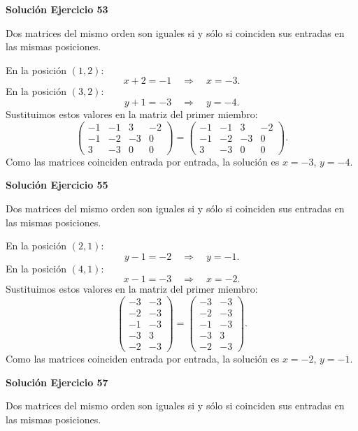\documentclass[12pt]{article}
\theoremstyle{remark}
\begin{document}
\par\bigskip\noindent\textbf{Solución Ejercicio 53}\par\nobreak
Dos matrices del mismo orden son iguales si y sólo si coinciden sus entradas en las mismas posiciones.

En la posición $(1,2)$:
\[
x + 2=-1\quad\Longrightarrow\quad x=-3.
\]
En la posición $(3,2)$:
\[
y + 1=-3\quad\Longrightarrow\quad y=-4.
\]
Sustituimos estos valores en la matriz del primer miembro:
\[
\begin{pmatrix}-1&-1&3&-2\\-1&-2&-3&0\\3&-3&0&0\end{pmatrix}=\begin{pmatrix}-1&-1&3&-2\\-1&-2&-3&0\\3&-3&0&0\end{pmatrix}.
\]
Como las matrices coinciden entrada por entrada, la solución es $x=-3$, $y=-4$.


\par\bigskip\noindent\textbf{Solución Ejercicio 55}\par\nobreak
Dos matrices del mismo orden son iguales si y sólo si coinciden sus entradas en las mismas posiciones.

En la posición $(2,1)$:
\[
y - 1=-2\quad\Longrightarrow\quad y=-1.
\]
En la posición $(4,1)$:
\[
x - 1=-3\quad\Longrightarrow\quad x=-2.
\]
Sustituimos estos valores en la matriz del primer miembro:
\[
\begin{pmatrix}-3&-3\\-2&-3\\-1&-3\\-3&3\\-2&-3\end{pmatrix}=\begin{pmatrix}-3&-3\\-2&-3\\-1&-3\\-3&3\\-2&-3\end{pmatrix}.
\]
Como las matrices coinciden entrada por entrada, la solución es $x=-2$, $y=-1$.


\par\bigskip\noindent\textbf{Solución Ejercicio 57}\par\nobreak
Dos matrices del mismo orden son iguales si y sólo si coinciden sus entradas en las mismas posiciones.
\end{document}
